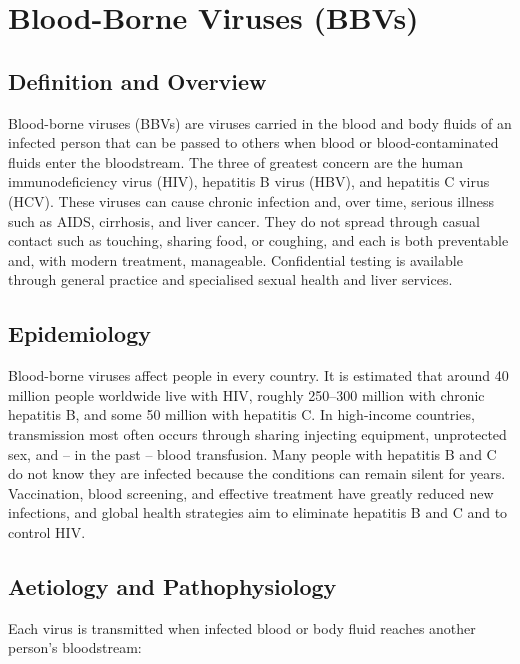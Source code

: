 \chapter{Blood-Borne Viruses (BBVs)}

\section*{Definition and Overview}
Blood-borne viruses (BBVs) are viruses carried in the blood and body fluids of an infected person that can be passed to others when blood or blood-contaminated fluids enter the bloodstream. The three of greatest concern are the human immunodeficiency virus (HIV), hepatitis B virus (HBV), and hepatitis C virus (HCV). These viruses can cause chronic infection and, over time, serious illness such as AIDS, cirrhosis, and liver cancer. They do not spread through casual contact such as touching, sharing food, or coughing, and each is both preventable and, with modern treatment, manageable. Confidential testing is available through general practice and specialised sexual health and liver services.

\section*{Epidemiology}
Blood-borne viruses affect people in every country. It is estimated that around 40 million people worldwide live with HIV, roughly 250--300 million with chronic hepatitis B, and some 50 million with hepatitis C. In high-income countries, transmission most often occurs through sharing injecting equipment, unprotected sex, and -- in the past -- blood transfusion. Many people with hepatitis B and C do not know they are infected because the conditions can remain silent for years. Vaccination, blood screening, and effective treatment have greatly reduced new infections, and global health strategies aim to eliminate hepatitis B and C and to control HIV.

\section*{Aetiology and Pathophysiology}
Each virus is transmitted when infected blood or body fluid reaches another person's bloodstream:

